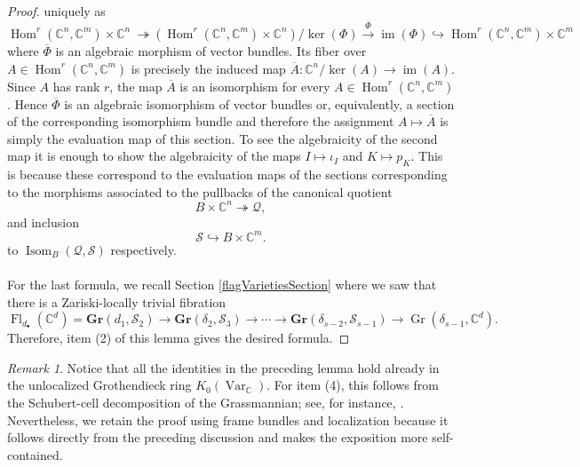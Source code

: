 \documentclass{amsart}
\theoremstyle{plain}
\numberwithin{equation}{section}
\theoremstyle{definition}
\theoremstyle{remark}
\newtheorem{remark}[theorem]{Remark}
\begin{document}
\begin{proof}
		uniquely as
		$$
		\operatorname{Hom}^r(\mathbb{C}^n,\mathbb{C}^m)\times \mathbb{C}^n\
		\twoheadrightarrow
		(\operatorname{Hom}^r(\mathbb{C}^n,\mathbb{C}^m)\times \mathbb{C}^n)/\ker(\Phi)
		\xrightarrow{\ \overline\Phi\ }
		\operatorname{im}(\Phi)
		\hookrightarrow
		\operatorname{Hom}^r(\mathbb{C}^n,\mathbb{C}^m)\times \mathbb{C}^m
		$$
		where $\overline\Phi$ is an algebraic morphism of
		vector bundles. Its fiber over $A\in \operatorname{Hom}^r(\mathbb{C}^n,\mathbb{C}^m)$ is precisely the induced map	$\overline A:\mathbb C^n/\ker(A)\longrightarrow\operatorname{im}(A)$.
		Since $A$ has rank $r$, the map $\overline A$ is an isomorphism for
		every $A\in \operatorname{Hom}^r(\mathbb{C}^n,\mathbb{C}^m)$. Hence $\overline\Phi$ is an algebraic isomorphism of
		vector bundles or, equivalently, a section of the corresponding isomorphism bundle and therefore the assignment $A\mapsto \overline{A}$ is simply the evaluation map of this section. To see the algebraicity of the second map it is enough to show the algebraicity of the maps $I\mapsto \iota_I$ and $K\mapsto p_K$. This is because these correspond to the evaluation maps of the sections corresponding to the morphisms associated to the  pullbacks of the canonical quotient
		\[
		B\times\mathbb C^n\twoheadrightarrow\mathcal Q,
		\]
		and inclusion
		\[
		\mathcal S\hookrightarrow B\times\mathbb C^m.
		\]
		to $\operatorname{Isom}_B(\mathcal{Q},\mathcal{S})$ respectively.
				\\
		\\
		For the last formula, we recall Section \ref{flagVarietiesSection} where we saw that there is a Zariski-locally trivial fibration
		$$
		\operatorname{Fl}_{d_\bullet}(\mathbb{C}^d)=\mathbf{Gr}(d_1,\mathcal{S}_2)\longrightarrow \mathbf{Gr}(\delta_2,\mathcal{S}_3)\longrightarrow \cdots\longrightarrow \mathbf{Gr}(\delta_{s-2},\mathcal{S}_{s-1})\longrightarrow\operatorname{Gr}(\delta_{s-1},\mathbb{C}^d).
		$$
		Therefore, item (2) of this lemma gives the desired formula. 
	\end{proof}
	\begin{remark}
	Notice that all the identities in the preceding lemma hold already in the unlocalized Grothendieck ring $K_0(\operatorname{Var}_{\mathbb C})$. For item (4), this follows from the Schubert-cell decomposition of the Grassmannian; see, for instance, \cite[Section 9.1]{AndersonFultonEquivariantCohomology}. Nevertheless, we retain the proof using frame bundles and localization because it follows directly from the preceding discussion and makes the exposition more self-contained.
	\end{remark}
	
\end{document}
